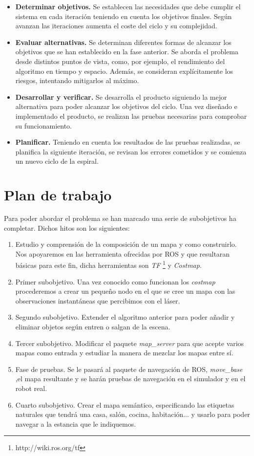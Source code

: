 \begin{itemize}
\item \textbf{Determinar objetivos.} Se establecen las necesidades que debe cumplir el sistema en cada iteración teniendo en cuenta los objetivos finales. Según avanzan las iteraciones aumenta el coste del ciclo y su complejidad.
\item \textbf{Evaluar alternativas.} Se determinan diferentes formas de alcanzar los objetivos que se han establecido en la fase anterior. Se aborda el problema desde distintos puntos de vista, como, por ejemplo, el rendimiento del algoritmo en tiempo y espacio. Además, se consideran explícitamente los riesgos, intentando mitigarlos al máximo.
\item \textbf{Desarrollar y verificar.} Se desarrolla el producto siguiendo la mejor alternativa para poder alcanzar los objetivos del ciclo. Una vez diseñado e implementado el producto, se realizan las pruebas necesarias para comprobar su funcionamiento.
\item \textbf{Planificar.} Teniendo en cuenta los resultados de las pruebas realizadas, se planifica la siguiente iteración, se revisan los errores cometidos y se comienza un nuevo ciclo de la espiral.
\end{itemize}

\section{Plan de trabajo}
\label{sec:plandetrabajo}

Para poder abordar el problema se han marcado una serie de subobjetivos ha completar. Dichos hitos son los siguientes:

\begin{enumerate}
\item Estudio y comprensión de la composición de un mapa y como construirlo. Nos apoyaremos en las herramienta ofrecidas por ROS y que resultaran básicas para este fin, dicha herramientas son \textit{TF} \footnote{http://wiki.ros.org/tf} y \textit{Costmap}\footnotemark .
\item Primer subobjetivo. Una vez conocido como funcionan los \textit{costmap} procederemos a crear un pequeño nodo en el que se cree un mapa con las observaciones instantáneas que percibimos con el láser.
\item Segundo subobjetivo. Extender el algoritmo anterior para poder añadir y eliminar objetos según entren o salgan de la escena.
\item Tercer subobjetivo. Modificar el paquete \textit{map\_server} para que acepte varios mapas como entrada y estudiar la manera de mezclar los mapas entre sí.
\item Fase de pruebas. Se le pasará al paquete de navegación de ROS, \textit{move\_base} ,el mapa resultante y se harán pruebas de navegación en el simulador y en el robot real.
\item Cuarto subobjetivo. Crear el mapa semántico, especificando las etiquetas naturales que tendrá una casa, salón, cocina, habitación... y usarlo para poder navegar a la estancia que le indiquemos.
\end{enumerate}
